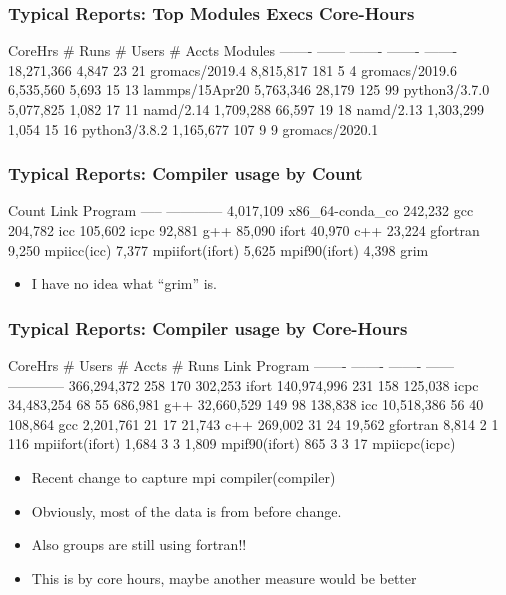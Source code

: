 \documentclass{beamer}
\begin{document}
\begin{frame}[fragile]
    \frametitle{Typical Reports: Top Modules Execs Core-Hours}
 {\tiny
    \begin{semiverbatim}
   CoreHrs  # Runs  # Users  # Accts  Modules
   -------  ------  -------  -------  -------
18,271,366   4,847       23       21  gromacs/2019.4
 8,815,817     181        5        4  gromacs/2019.6
 6,535,560   5,693       15       13  lammps/15Apr20
 5,763,346  28,179      125       99  python3/3.7.0
 5,077,825   1,082       17       11  namd/2.14
 1,709,288  66,597       19       18  namd/2.13
 1,303,299   1,054       15       16  python3/3.8.2
 1,165,677     107        9        9  gromacs/2020.1
    \end{semiverbatim}
}
\end{frame}

\begin{frame}[fragile]
    \frametitle{Typical Reports: Compiler usage by Count}
 {\small
    \begin{semiverbatim}
    Count  Link Program
    -----  ------------
4,017,109  x86_64-conda_co
  242,232  gcc
  204,782  icc
  105,602  icpc
   92,881  g++
   85,090  ifort
   40,970  c++
   23,224  gfortran
    9,250  mpiicc(icc)
    7,377  mpiifort(ifort)
    5,625  mpif90(ifort)
    4,398  grim
    \end{semiverbatim}
}
  \begin{itemize}
    \item I have no idea what ``grim'' is.
  \end{itemize}
\end{frame}


\begin{frame}[fragile]
    \frametitle{Typical Reports: Compiler usage by Core-Hours}
 {\tiny
    \begin{semiverbatim}
    CoreHrs  # Users  # Accts  # Runs   Link Program
    -------  -------  -------  ------   ------------
366,294,372      258      170  302,253  ifort
140,974,996      231      158  125,038  icpc
 34,483,254       68       55  686,981  g++
 32,660,529      149       98  138,838  icc
 10,518,386       56       40  108,864  gcc
  2,201,761       21       17  21,743   c++
    269,002       31       24  19,562   gfortran
      8,814        2        1  116      mpiifort(ifort)
      1,684        3        3  1,809    mpif90(ifort)
        865        3        3  17       mpiicpc(icpc)
    \end{semiverbatim}
}
  \begin{itemize}
    \item Recent change to capture mpi compiler(compiler)
    \item Obviously, most of the data is from before change.
    \item Also groups are still using fortran!!
    \item This is by core hours, maybe another measure would be better
  \end{itemize}
\end{frame}
\end{document}
